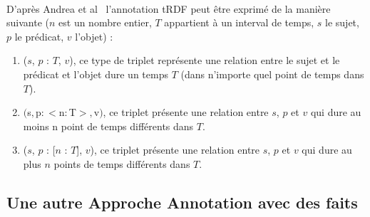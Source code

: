 \paragraph{}
D'après Andrea et al~\cite{pugliese2008} l’annotation tRDF peut être exprimé de la manière suivante ($n$ est un nombre entier, $T$ appartient à un interval de temps, $s$ le sujet, $p$ le prédicat, $v$ l'objet) :
\begin{enumerate}
\item ($s$, $p$ : {$T$}, $v$), ce type de triplet représente une relation entre le sujet et le prédicat et l'objet dure un temps $T$ (dans n'importe quel point de temps dans $T$).
\item $($s$, $p$ : <$n$ : $T$>, $v$)$, ce triplet présente une relation entre $s$, $p$ et $v$ qui dure au moins n point de temps différents dans $T$.
\item ($s$, $p$ : [$n$ : $T$], $v$), ce triplet présente une relation entre $s$, $p$ et $v$ qui dure au plus $n$ points de temps différents dans $T$. 
\end{enumerate}
\subsection*{Une autre Approche Annotation avec des faits}
